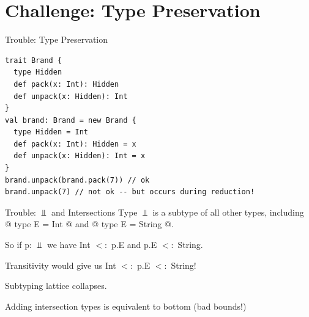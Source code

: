 \documentclass{beamer}
\begin{document}








\section{Challenge: Type Preservation}
\begin{frame}[fragile]{Trouble: Type Preservation}
\begin{verbatim}
trait Brand {
  type Hidden
  def pack(x: Int): Hidden
  def unpack(x: Hidden): Int
}
val brand: Brand = new Brand {
  type Hidden = Int
  def pack(x: Int): Hidden = x
  def unpack(x: Hidden): Int = x
}
brand.unpack(brand.pack(7)) // ok
brand.unpack(7) // not ok -- but occurs during reduction!
\end{verbatim}
\end{frame}



\begin{frame}[fragile]{Trouble: $\Bot$ and Intersections}
Type $\Bot$ is a subtype of all other types, including @{ type E = Int }@
and @{ type E = String }@.

\vspace{1em}
So if p: $\Bot$ we have Int $<:$ p.E and p.E $<:$ String. 

\vspace{1em}
Transitivity would give us Int $<:$ p.E $<:$ String!

\vspace{1em}
Subtyping lattice collapses.

\vspace{1em}
Adding intersection types is equivalent to bottom (bad bounds!)

\end{frame}
\end{document}
